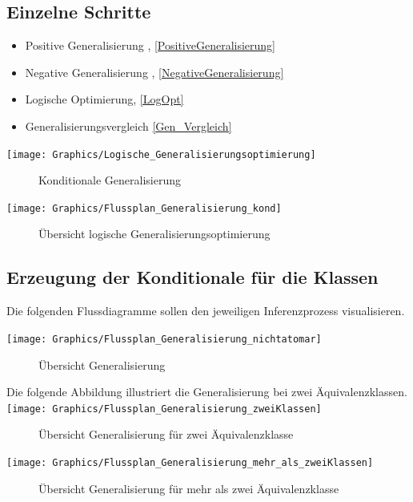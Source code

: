 \documentclass[a4paper, 11pt]{book}
\begin{document}
\subsection{Einzelne Schritte}
\begin{itemize}
	\item Positive Generalisierung , \ref{PositiveGeneralisierung}
	\item Negative Generalisierung , \ref{NegativeGeneralisierung}
	\item Logische Optimierung, \ref{LogOpt}
	\item Generalisierungsvergleich \ref{Gen_Vergleich}
\end{itemize}

\texttt{[image: Graphics/Logische\_Generalisierungsoptimierung]}
\begin{figure}[h]
	\caption{Konditionale Generalisierung }
	\label{Abb_Log_Gen}
\end{figure}


\texttt{[image: Graphics/Flussplan\_Generalisierung\_kond]}
\begin{figure}[h]
	\caption{Übersicht logische Generalisierungsoptimierung}
	\label{Fig_Log_Genopt}
\end{figure}


\subsection{Erzeugung der Konditionale für die Klassen}
Die folgenden Flussdiagramme sollen den jeweiligen Inferenzprozess visualisieren.

\texttt{[image: Graphics/Flussplan\_Generalisierung\_nichtatomar]}
\begin{figure}[h]
	\caption{Übersicht Generalisierung}
	\label{Fig_General}
\end{figure}
\newpage
Die folgende Abbildung illustriert die Generalisierung bei zwei Äquivalenzklassen.
\texttt{[image: Graphics/Flussplan\_Generalisierung\_zweiKlassen]}
\begin{figure}[h]
	\caption{Übersicht Generalisierung für zwei Äquivalenzklasse}
	\label{Fig_ZweiKlassen}
\end{figure}

\texttt{[image: Graphics/Flussplan\_Generalisierung\_mehr\_als\_zweiKlassen]}
\begin{figure}[h]
	\caption{Übersicht Generalisierung für mehr als zwei Äquivalenzklasse}
	\label{Fig_Mehr_Klassen}
\end{figure}
\end{document}
